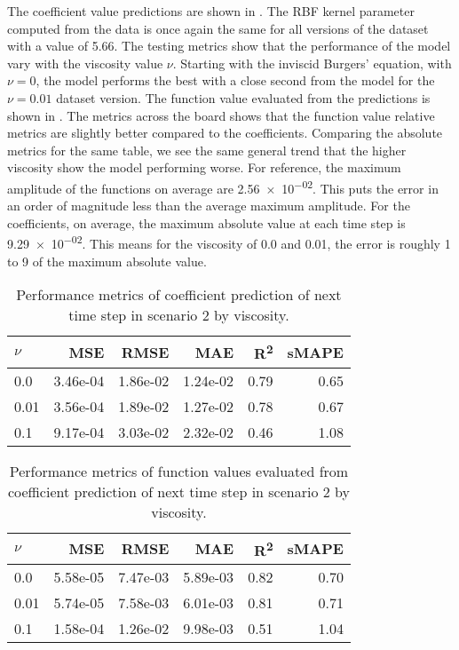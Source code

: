 The coefficient value predictions are shown in . The RBF kernel parameter computed from the data is once again the same for all versions of the dataset with a value of 5.66. The testing metrics show that the performance of the model vary with the viscosity value \(\nu \). Starting with the inviscid Burgers' equation, with \(\nu=0\), the model performs the best with a close second from the model for the \(\nu = 0.01 \) dataset version. The function value evaluated from the predictions is shown in . The metrics across the board shows that the function value relative metrics are slightly better compared to the coefficients. Comparing the absolute metrics for the same table, we see the same general trend that the higher viscosity show the model performing worse. For reference, the maximum amplitude of the functions on average are \num{2.56e-02}. This puts the error in an order of magnitude less than the average maximum amplitude. For the coefficients, on average, the maximum absolute value at each time step is \num{9.29e-02}. This means for the viscosity of 0.0 and \num{0.01}, the error is roughly 1 to 9 of the maximum absolute value.

\begin{table}[H]
  \caption{Performance metrics of coefficient prediction of next time step in scenario 2 by viscosity.}\label{table:scenario_2_spectral_metrics}
  \centering
  \begin{tabular}{lrrrrr}
    \toprule
    \(\nu \) & MSE      & RMSE     & MAE      & R\textsuperscript{2}   & sMAPE \\
    \midrule
    0.0      & 3.46e-04 & 1.86e-02 & 1.24e-02 & 0.79 & 0.65  \\
    0.01     & 3.56e-04 & 1.89e-02 & 1.27e-02 & 0.78 & 0.67  \\
    0.1      & 9.17e-04 & 3.03e-02 & 2.32e-02 & 0.46 & 1.08  \\
    \bottomrule
  \end{tabular}
\end{table}

\begin{table}[H]
  \caption{Performance metrics of function values evaluated from coefficient prediction of next time step in scenario 2 by viscosity.}\label{table:scenario_2_function_metrics}
  \centering
  \begin{tabular}{lrrrrr}
    \toprule
    \(\nu \) & MSE      & RMSE     & MAE      & R\textsuperscript{2}   & sMAPE \\
    \midrule
    0.0      & 5.58e-05 & 7.47e-03 & 5.89e-03 & 0.82 & 0.70  \\
    0.01     & 5.74e-05 & 7.58e-03 & 6.01e-03 & 0.81 & 0.71  \\
    0.1      & 1.58e-04 & 1.26e-02 & 9.98e-03 & 0.51 & 1.04  \\
    \bottomrule
  \end{tabular}
\end{table}

